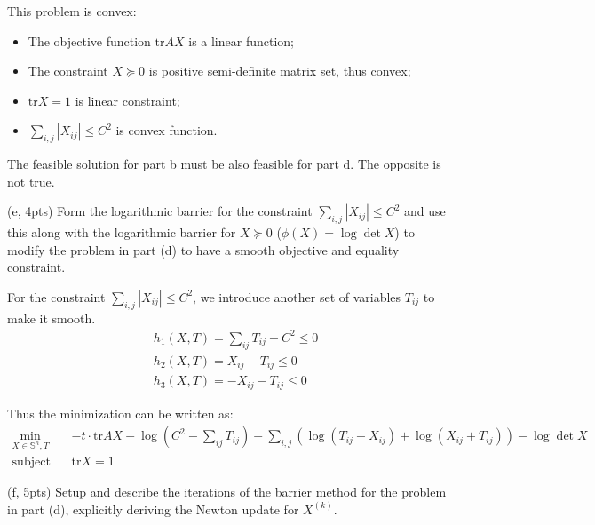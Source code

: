 \documentclass{article}
\theoremstyle{remark}
\theoremstyle{definition}
\newcommand{\st}{\mathop{\mathrm{subject\,\,to}}}
\def\tr{\mathrm{tr}}
\begin{document}
{
\color{blue}
This problem is convex:
\begin{itemize}
    \item The objective function $\tr AX$ is a linear function;
    \item The constraint $X\succeq 0$ is positive semi-definite matrix set, thus convex;
    \item $\tr X=1$ is linear constraint;
    \item $\sum_{i,j} |X_{ij}| \le C^2$ is convex function.
\end{itemize}

The feasible solution for part b must be also feasible for part d. The opposite is not true.
}

\bigskip
\noindent
(e, 4pts) Form the logarithmic barrier for the constraint $\sum_{i,j}|X_{ij}| \le C^2$
and use this along with the logarithmic barrier for $X \succeq 0$ ($\phi(X) =
\log \det X$) to modify the problem in part (d) to have a smooth objective and
equality constraint.

{
\color{blue}
For the constraint $\sum_{i,j}|X_{ij}| \le C^2$, we introduce another set of variables $T_{ij}$ to make it smooth.
\begin{align*}
    &h_1(X,T)=\sum_{ij}T_{ij} - C^2 \leq 0 \\
    &h_2(X,T)=X_{ij}-T_{ij} \leq 0 \\
    &h_3(X,T)=-X_{ij}-T_{ij} \leq 0
\end{align*}

Thus the minimization can be written as:
\[
\begin{split}
\min_{X \in \mathbb{S}^n, T} \;\; & -t\cdot \tr AX -\log (C^2-\sum_{ij}T_{ij}) -\sum_{i,j}(\log (T_{ij}-X_{ij})+\log (X_{ij}+T_{ij}))- \log \det X\\
\st \;\; & \tr X = 1
\end{split}
\]
}

\bigskip
\noindent
(f, 5pts) Setup and describe the iterations of the barrier method for the problem in
part (d), explicitly deriving the Newton update for $X^{(k)}$.
\end{document}
